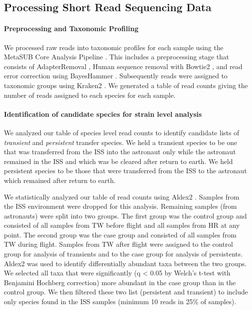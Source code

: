 \subsection{Processing Short Read Sequencing Data}

\paragraph{Preprocessing and Taxonomic Profiling}
We processed raw reads into taxonomic profiles for each sample using the MetaSUB Core Analysis Pipeline \citep{danko2020metasub}. This includes a preprocessing stage that consists of AdapterRemoval \citep{Schubert2016}, Human sequence removal with Bowtie2 \citep{LangmeadandStevenLSalzberg2013}, and read error correction using BayesHammer \citep{Nikolenko2013}. Subsequently reads were assigned to taxonomic groups using Kraken2 \citep{Wood2019}. We generated a table of read counts giving the number of reads assigned to each species for each sample.

\paragraph{Identification of candidate species for strain level analysis}

We analyzed our table of species level read counts to identify candidate lists of \textit{transient} and \textit{persistent} transfer species. We held a transient species to be one that was transferred from the ISS into the astronaut only while the astronaut remained in the ISS and which was be cleared after return to earth. We held persistent species to be those that were transferred from the ISS to the astronaut which remained after return to earth.

We statistically analyzed our table of read counts using Aldex2 \citep{Fernandes2013}. Samples from the ISS environment were dropped for this analysis. Remaining samples (from astronauts) were split into two groups. The first group was the control group and consisted of all samples from TW before flight and all samples from HR at any point. The second group was the case group and consisted of all samples from TW during flight. Samples from TW after flight were assigned to the control group for analysis of transients and to the case group for analysis of persistents. Aldex2 was used to identify differentially abundant taxa between the two groups. We selected all taxa that were significantly (q < 0.05 by Welch's t-test with Benjamini Hochberg correction) more abundant in the case group than in the control group. We then filtered these two list (persistent and transient) to include only species found in the ISS samples (minimum 10 reads in 25\% of samples).  

